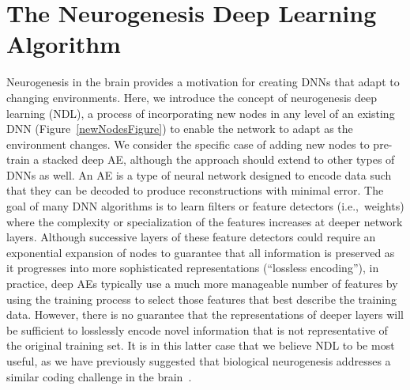 \documentclass[10pt,conference]{IEEEtran}
\begin{document}
\section{The Neurogenesis Deep Learning Algorithm}
Neurogenesis in the brain provides a motivation for creating DNNs that adapt to changing environments. Here, we introduce the concept of neurogenesis deep learning (NDL), a process of incorporating new nodes in any level of an existing DNN (Figure~\ref{newNodesFigure}) to enable the network to adapt as the environment changes. We consider the specific case of adding new nodes to pre-train a stacked deep AE, although the approach should extend to other types of DNNs as well. An AE is a type of neural network designed to encode data such that they can be decoded to produce reconstructions with minimal error. The goal of many DNN algorithms is to learn filters or feature detectors (i.e.,~weights) where the complexity or specialization of the features increases at deeper network layers. Although successive layers of these feature detectors could require an exponential expansion of nodes to guarantee that all information is preserved as it progresses into more sophisticated representations (``lossless encoding''), in practice, deep AEs typically use a much more manageable number of features by using the training process to select those features that best describe the training data. However, there is no guarantee that the representations of deeper layers will be sufficient to losslessly encode novel information that is not representative of the original training set. It is in this latter case that we believe NDL to be most useful, as we have previously suggested that biological neurogenesis addresses a similar coding challenge in the brain~\cite{aimone2011resolving}.
\end{document}
